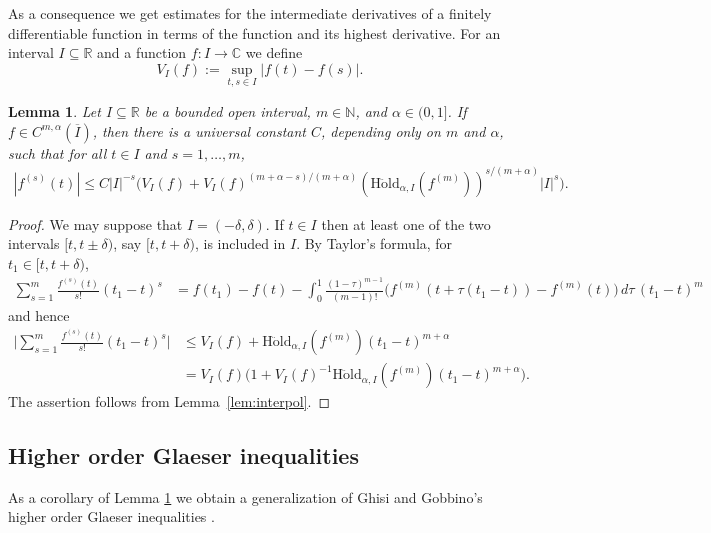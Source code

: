 \documentclass[12pt]{amsart}
\theoremstyle{plain}
\newtheorem{lemma}{Lemma}
\theoremstyle{definition}
\numberwithin{equation}{section}
\let\on=\operatorname
\begin{document}
As a consequence we get estimates for the intermediate derivatives of a finitely differentiable function in terms of the 
function and its highest derivative. 
For an interval $I \subseteq {\mathbb{R}}$ and a function $f : I \to {\mathbb{C}}$ we define
\[
  V_I(f) := \sup_{t,s \in I} |f(t)-f(s)|.
\]

\begin{lemma} \label{taylor} 
  Let $I \subseteq {\mathbb{R}}$ be a bounded open interval, $m \in {\mathbb{N}}$, and ${\alpha} \in (0,1]$.
  If $f\in C^{m,{\alpha}}(\overline I)$, then there is a universal constant $C$, depending only on $m$ and ${\alpha}$, 
  such that for all $t\in I$ 
  and  $s = 1,\ldots,m$,  
    \begin{align}\label{eq:1}  
    |f^{(s)}(t) | \le C |I|^{-s} \bigl(V_I(f) + V_I(f)^{(m+{\alpha}-s)/(m+{\alpha})} ({\on{H\ddot{o}ld}}_{{\alpha},I}(f^{(m)}))^{s/(m+{\alpha})}  |I|^s
    \bigr)  .  
  \end{align}
\end{lemma}

\begin{proof}
We may suppose that $I=(-\delta, \delta)$. If $t \in I$ then at least one of the two intervals
 $[t,t\pm \delta )$, say $[t,t+ \delta )$, is included in $I$.  
 By Taylor's formula, for $t_1\in [t,t +\delta )$, 
\begin{align*}
      \sum_{s=1}^{m}  \frac{{f}^{(s)}(t)}{s!} (t_1-t)^s 
       & = f(t_1)-f(t) -  \int_0^1 \frac {(1-{\tau})^{m-1}}{(m-1)!} \big(f^{(m)}(t+{\tau}(t_1-t))-f^{(m)}(t)\big)\, d{\tau}\, (t_1-t)^m      
\end{align*}
and hence
    \begin{align*}
      \Big|\sum_{s=1}^{m}  \frac{{f}^{(s)}(t)}{s!} (t_1-t)^s\Big| 
      & \le V_I(f)+  {\on{H\ddot{o}ld}}_{{\alpha},I}(f^{(m)})  (t_1-t)^{m+{\alpha}}
      \\
      & = V_I(f)\big(1 + V_I(f)^{-1} {\on{H\ddot{o}ld}}_{{\alpha},I}(f^{(m)})  (t_1-t)^{m+{\alpha}} \big).        
    \end{align*}
The assertion follows from Lemma~\ref{lem:interpol}.   
\end{proof}

\subsection{Higher order Glaeser inequalities} \label{Glaeser}

As a corollary of Lemma \ref{taylor} we obtain a generalization of 
Ghisi and Gobbino's higher order Glaeser inequalities \cite[Prop.~3.4]{GhisiGobbino13}.
\end{document}
